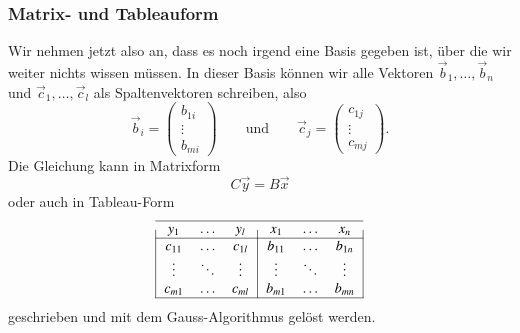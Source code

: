 \subsubsection{Matrix- und Tableauform}
Wir nehmen jetzt also an, dass es noch irgend eine Basis gegeben ist,
über die wir weiter nichts wissen müssen.
In dieser Basis können wir alle Vektoren
$\vec{b}_1,\dots,\vec{b}_n$ und $\vec{c}_1,\dots,\vec{c}_l$
als Spaltenvektoren schreiben, also
\[
\vec{b}_i = \begin{pmatrix}b_{1i}\\\vdots\\b_{mi}\end{pmatrix}
\qquad\text{und}\qquad
\vec{c}_j = \begin{pmatrix}c_{1j}\\\vdots\\c_{mj}\end{pmatrix}.
\]
Die Gleichung
\label{skript:affin:basistransformation-ansatz}
kann in Matrixform
\begin{equation}
C\vec{y} = B\vec{x}
\label{skript:affin:basistransformation-matrix}
\end{equation}
oder auch
in Tableau-Form
\begin{equation}
\begin{tabular}{|>{$}c<{$}>{$}c<{$}>{$}c<{$}|>{$}c<{$}>{$}c<{$}>{$}c<{$}|}
\hline
   y_1&\dots &   y_l&   x_1&\dots &   x_n\\
\hline
c_{11}&\dots &c_{1l}&b_{11}&\dots &b_{1n}\\
\vdots&\ddots&\vdots&\vdots&\ddots&\vdots\\
c_{m1}&\dots &c_{ml}&b_{m1}&\dots &b_{mn}\\
\hline
\end{tabular}
\label{skript:affin:basistransformation-tableau}
\end{equation}
geschrieben und mit dem Gauss-Algorithmus gelöst werden.

